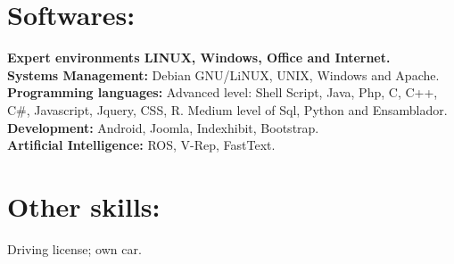 \documentclass	[10pt,a4paper,oneside]{article}
\newcommand{\seccion}[1]{\vspace*{3mm}\section*{#1}\vspace*{-3mm}}
\begin{document}
\seccion{Softwares:}
\textbf{Expert environments LINUX, Windows, Office and Internet.}\\
\textbf{Systems Management:} Debian GNU/LiNUX, UNIX, Windows and Apache.\\
\textbf{Programming languages:} Advanced level: Shell Script, Java, Php, C,
C++, C\#, Javascript, Jquery, CSS, R. Medium level of Sql, Python and Ensamblador.\\
\textbf{Development:} Android, Joomla, Indexhibit, Bootstrap.\\
\textbf{Artificial Intelligence:} ROS, V-Rep, FastText.


\seccion{Other skills:}
Driving license; own car.\\
\end{document}
